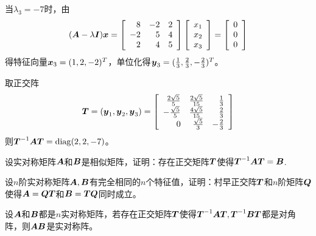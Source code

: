 \begin{frame}
  \begin{jie}
    当$\lambda_3=-7$时，由
    $$
    (\boldsymbol{A}-\lambda\boldsymbol{I}){\boldsymbol{x}}=\left[
      \begin{array}{rrr}
        8&-2&2\\
        -2&5&4\\
        2&4&5
      \end{array}
    \right]\left[
      \begin{array}{c}
        x_1\\
        x_2\\
        x_3
      \end{array}
    \right]=
    \left[
      \begin{array}{c}
        0\\
        0\\
        0
      \end{array}
    \right]
    $$
    得特征向量${\boldsymbol{x}}_3=(1,2,-2)^T$，单位化得${\boldsymbol{y}}_3=(\frac13,\frac23,-\frac23)^T$。
     \end{jie}
\end{frame}

\begin{frame}
  \begin{jie}
    取正交阵
    $$
    \boldsymbol{T}=({\boldsymbol{y}}_1,{\boldsymbol{y}}_2,{\boldsymbol{y}}_3)=\left[
      \begin{array}{rrr}
        \frac{2\sqrt5}5 &\frac{2\sqrt5}{15}&\frac13\\
        -\frac{\sqrt 5}5&\frac{4\sqrt5}{15}&\frac23\\
        0&\frac{\sqrt5}3&-\frac23
      \end{array}
    \right]
    $$
    则$\boldsymbol{T}^{-1}\boldsymbol{A}\boldsymbol{T}=\mathrm{diag}(2,2,-7)$。
  \end{jie}
\end{frame}

\begin{frame}
  \begin{li}
    设实对称矩阵$\boldsymbol{A}$和$\boldsymbol{B}$是相似矩阵，证明：存在正交矩阵$\boldsymbol{T}$使得$\boldsymbol{T}^{-1}\boldsymbol{A}\boldsymbol{T}=\boldsymbol{B}$.
  \end{li}
\end{frame}

\begin{frame}
  \begin{li}
    设$n$阶实对称矩阵$\boldsymbol{A},\boldsymbol{B}$有完全相同的$n$个特征值，证明：村早正交阵$\boldsymbol{T}$和$n$阶矩阵$\boldsymbol{Q}$使得$\boldsymbol{A}=\boldsymbol{Q}\boldsymbol{T}$和$\boldsymbol{B}=\boldsymbol{T}\boldsymbol{Q}$同时成立。
  \end{li}
\end{frame}

\begin{frame}
  \begin{li}
    设$\boldsymbol{A}$和$\boldsymbol{B}$都是$n$实对称矩阵，若存在正交矩阵$\boldsymbol{T}$使得$\boldsymbol{T}^{-1}\boldsymbol{A}\boldsymbol{T}, \boldsymbol{T}^{-1}\boldsymbol{B}\boldsymbol{T}$都是对角阵，则$\boldsymbol{A}\boldsymbol{B}$是实对称阵。
  \end{li}
\end{frame}